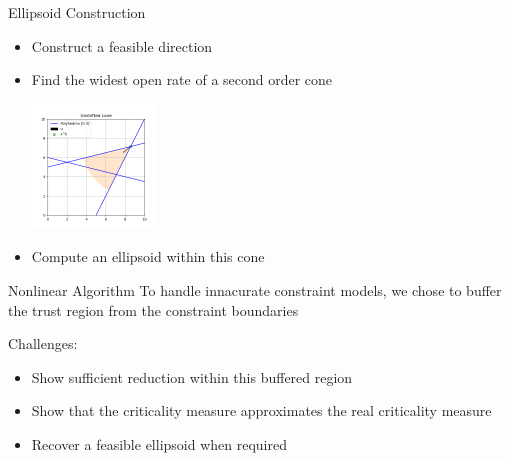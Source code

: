 \documentclass{beamer}
\begin{document}
\begin{frame}{Ellipsoid Construction}
	\begin{itemize}
		\item Construct a feasible direction
		\item Find the widest open rate of a second order cone
		\begin{center}
			\includegraphics[width=125px]{images/unshifted_cone.png}
		\end{center}
		\item Compute an ellipsoid within this cone
	\end{itemize}
\end{frame}

% 	

% 


\begin{frame}{Nonlinear Algorithm}
	To handle innacurate constraint models, we chose to buffer the trust region from the constraint boundaries
	
	\begin{block}{Challenges:}
		\begin{itemize}
		\item Show sufficient reduction within this buffered region
		\item Show that the criticality measure approximates the real criticality measure
		\item Recover a feasible ellipsoid when required
		\end{itemize}
	\end{block}
\end{frame}
\end{document}
